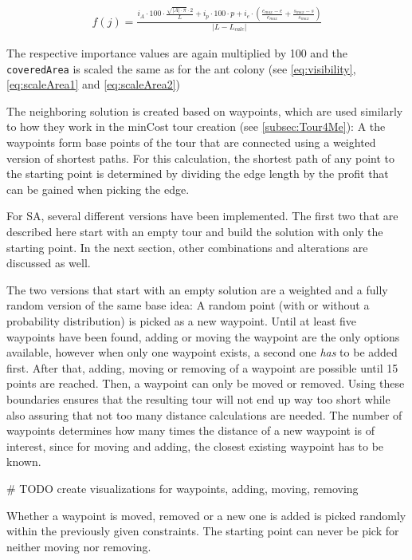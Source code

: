 \begin{equation}
	\label{eq:qualitySA}
	\begin{split}
		f(j) = \frac{i_A \cdot 100 \cdot \frac{\sqrt{|A|\cdot \pi} \cdot 2 }{L} 
		+  i_p \cdot 100 \cdot p
		+ i_e \cdot \left(\frac{e_{max} - e}{e_{max}} + \frac{s_{max} - s}{s_{max}}\right)}{\left| L - L_{calc} \right|}
	\end{split}
\end{equation}

The respective importance values are again multiplied by 100 and the  \texttt{coveredArea} is scaled the same as for the ant colony (see \ref{eq:visibility}, \ref{eq:scaleArea1} and \ref{eq:scaleArea2})

The neighboring solution is created based on waypoints, which are used similarly to how they work in the minCost tour creation (see \ref{subsec:Tour4Me}):
A the waypoints form base points of the tour that are connected using a weighted version of shortest paths. 
For this calculation, the shortest path of any point to the starting point is determined by dividing the edge length by the profit that can be gained when picking the edge. 

For SA, several different versions have been implemented.
The first two that are described here start with an empty tour and build the solution with only the starting point.
In the next section, other combinations and alterations are discussed as well.

The two versions that start with an empty solution are a weighted and a fully random version of the same base idea:
A random point (with or without a probability distribution) is picked as a new waypoint. 
Until at least five waypoints have been found, adding or moving the waypoint are the only options available, however when only one waypoint exists, a second one \textit{has} to be added first.
After that, adding, moving or removing of a waypoint are possible until 15 points are reached.
Then, a waypoint can only be moved or removed.
Using these boundaries ensures that the resulting tour will not end up way too short while also assuring that not too many distance calculations are needed.
The number of waypoints determines how many times the distance of a new waypoint is of interest, since for moving and adding, the closest existing waypoint has to be known.

\# TODO create visualizations for waypoints, adding, moving, removing 

Whether a waypoint is moved, removed or a new one is added is picked randomly within the previously given constraints.
The starting point can never be pick for neither moving nor removing.

